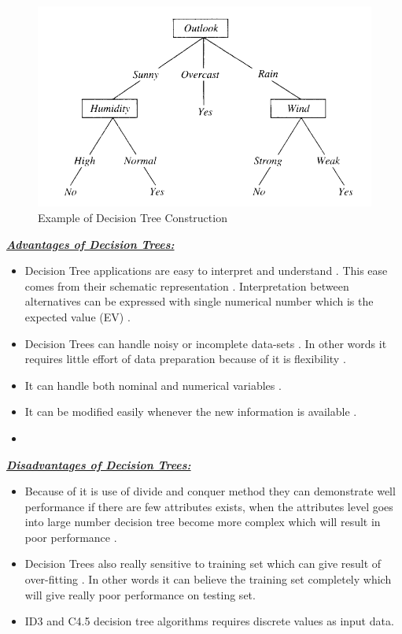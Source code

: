 \documentclass[sigconf]{acmart}
\begin{document}
 \begin{figure}[!ht]
  \centering
      \includegraphics[width=\columnwidth]{project/images/decison_tree.png}
  \caption{Example of Decision Tree Construction\cite{www-cs.princeton}}\label{fig:Decision Tree}
\end{figure}

\textbf{\underline{\textit{Advantages of Decision Trees:}}}

\begin{itemize}
\item Decision Tree applications are easy to interpret and understand \cite{www-cs.ubb}. This ease comes from their schematic representation \cite{www-cs.ubb}. Interpretation between alternatives can be expressed with single numerical number which is the expected value (EV) \cite{www-cs.ubb}.  
\item Decision Trees can handle noisy or incomplete data-sets \cite{www-cs.ubb}. In other words it requires little effort of data preparation because of it is flexibility \cite{www-simafore}.  
\item It can handle both nominal and numerical variables \cite{www-cs.ubb}.
\item It can be modified easily whenever the new information is available \cite{www-cs.ubb}.
\item 
\end{itemize}


\textbf{\underline{\textit{Disadvantages of Decision Trees:}}}

\begin{itemize}
\item Because of it is use of divide and conquer method they can demonstrate well performance if there are few attributes exists, when the attributes level goes into large number decision tree become more complex which will result in poor performance \cite{www-cs.ubb}.
\item Decision Trees also really sensitive to training set which can give result of over-fitting \cite{www-cs.ubb}. In other words it can believe the training set completely which will give really poor performance on testing set.
\item ID3 and C4.5 decision tree algorithms requires discrete values as input data. 
\end{itemize}
\end{document}
